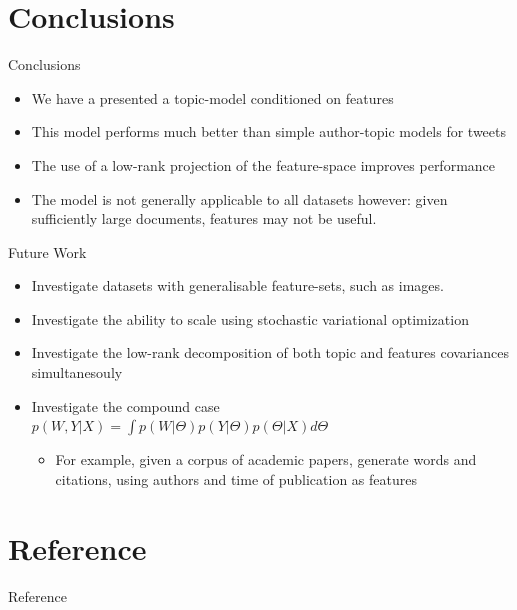 \documentclass[xcolor=dvipsnames]{beamer}
\begin{document}
\section{Conclusions}
\begin{frame}{Conclusions}
\begin{itemize}
    \item We have a presented a topic-model conditioned on features
    \item This model performs much better than simple author-topic models for tweets
    \item The use of a low-rank projection of the feature-space improves performance
    \item The model is not generally applicable to all datasets however: given sufficiently large documents, features may not be useful.
\end{itemize}
\end{frame}

\begin{frame}{Future Work}
    \begin{itemize}
    \item Investigate datasets with generalisable feature-sets, such as images.
    \item Investigate the ability to scale using stochastic variational optimization \cite{Hoffman2012}
    \item Investigate the low-rank decomposition of both topic and features covariances simultanesouly
    \item Investigate the compound case $p(W,Y|X) = \int p(W|\Theta) p(Y|\Theta) p(\Theta|X) d\Theta$
        \begin{itemize}
            \item For example, given a corpus of academic papers, generate words and citations, using authors and time of publication as features
        \end{itemize}
     \end{itemize}
\end{frame}


\begin{frame}

\end{frame}






\section{Reference}
\begin{frame}[allowframebreaks]{Reference}






\end{frame}
\end{document}
